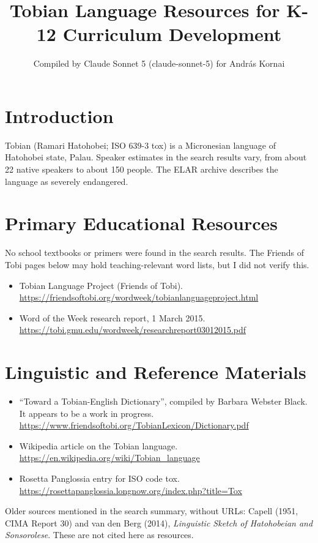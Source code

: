 \documentclass[12pt]{article}
\title{Tobian Language Resources for K-12 Curriculum Development}
\author{Compiled by Claude Sonnet 5 (claude-sonnet-5) for Andr\'as Kornai}
\date{}
\begin{document}
\maketitle

\section{Introduction}
Tobian (Ramari Hatohobei; ISO 639-3 tox) is a Micronesian language of Hatohobei state, Palau. Speaker estimates in the search results vary, from about 22 native speakers to about 150 people. The ELAR archive describes the language as severely endangered.

\section{Primary Educational Resources}
No school textbooks or primers were found in the search results. The Friends of Tobi pages below may hold teaching-relevant word lists, but I did not verify this.
\begin{itemize}
\item Tobian Language Project (Friends of Tobi). \url{https://friendsoftobi.org/wordweek/tobianlanguageproject.html}
\item Word of the Week research report, 1 March 2015. \url{https://tobi.gmu.edu/wordweek/researchreport03012015.pdf}
\end{itemize}

\section{Linguistic and Reference Materials}
\begin{itemize}
\item ``Toward a Tobian-English Dictionary'', compiled by Barbara Webster Black. It appears to be a work in progress. \url{https://www.friendsoftobi.org/TobianLexicon/Dictionary.pdf}
\item Wikipedia article on the Tobian language. \url{https://en.wikipedia.org/wiki/Tobian_language}
\item Rosetta Panglossia entry for ISO code tox. \url{https://rosettapanglossia.longnow.org/index.php?title=Tox}
\end{itemize}
Older sources mentioned in the search summary, without URLs: Capell (1951, CIMA Report 30) and van den Berg (2014), \emph{Linguistic Sketch of Hatohobeian and Sonsorolese}. These are not cited here as resources.
\end{document}
